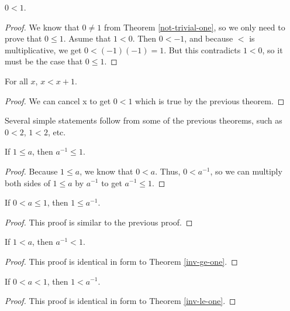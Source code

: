 \documentclass[../math.tex]{subfiles}
\begin{document}
\begin{theorem} \label{one-pos}
    $0 < 1$.
\end{theorem}
\begin{proof}
    We know that $0 \neq 1$ from Theorem \ref{not-trivial-one}, so we only need
    to prove that $0 \leq 1$.  Asume that $1 < 0$.  Then $0 < -1$, and because
    $<$ is multiplicative, we get $0 < (-1)(-1) = 1$.  But this contradicts $1 <
    0$, so it must be the case that $0 \leq 1$.
\end{proof}

\begin{theorem}
    For all $x$, $x < x + 1$.
\end{theorem}
\begin{proof}
    We can cancel x to get $0 < 1$ which is true by the previous theorem.
\end{proof}

Several simple statements follow from some of the previous theorems, such as $0
< 2$, $1 < 2$, etc.

\begin{theorem} \label{inv-ge-one}
    If $1 \leq a$, then $a^{-1} \leq 1$.
\end{theorem}
\begin{proof}
    Because $1 \leq a$, we know that $0 < a$.  Thus, $0 < a^{-1}$, so we can
    multiply both sides of $1 \leq a$ by $a^{-1}$ to get $a^{-1} \leq 1$.
\end{proof}

\begin{theorem} \label{inv-le-one}
    If $0 < a \leq 1$, then $1 \leq a^{-1}$.
\end{theorem}
\begin{proof}
    This proof is similar to the previous proof.
\end{proof}

\begin{theorem}
    If $1 < a$, then $a^{-1} < 1$.
\end{theorem}
\begin{proof}
    This proof is identical in form to Theorem \ref{inv-ge-one}.
\end{proof}

\begin{theorem}
    If $0 < a < 1$, then $1 < a^{-1}$.
\end{theorem}
\begin{proof}
    This proof is identical in form to Theorem \ref{inv-le-one}.
\end{proof}
\end{document}
